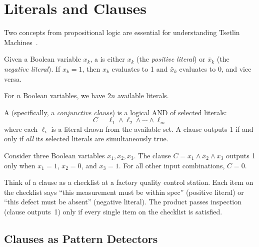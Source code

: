 \section{Literals and Clauses}
\label{sec:literals-clauses}

Two concepts from propositional logic are essential for understanding
Tsetlin Machines~\cite{granmo2018tsetlin}.

\begin{definition}[Literal]
\label{def:literal}
Given a Boolean variable $x_k$, a  is either $x_k$
(the \emph{positive literal}) or $\bar{x}_k$ (the \emph{negative
literal}). If $x_k = 1$, then $x_k$ evaluates to 1 and $\bar{x}_k$
evaluates to 0, and vice versa.
\end{definition}

For $n$ Boolean variables, we have $2n$ available literals.

\begin{definition}[Clause]
\label{def:clause}
A  (specifically, a \emph{conjunctive clause}) is a
logical AND of selected literals:
\begin{equation}
  C = \ell_1 \wedge \ell_2 \wedge \cdots \wedge \ell_m
  \label{eq:clause-def}
\end{equation}
where each $\ell_i$ is a literal drawn from the available set.
A clause outputs 1 if and only if \emph{all} its selected literals
are simultaneously true.
\end{definition}

\begin{example}
Consider three Boolean variables $x_1, x_2, x_3$. The clause
$C = x_1 \wedge \bar{x}_2 \wedge x_3$
outputs 1 only when $x_1 = 1$, $x_2 = 0$, and $x_3 = 1$.
For all other input combinations, $C = 0$.
\end{example}

\begin{analogy}
Think of a clause as a checklist at a factory quality control station.
Each item on the checklist says ``this measurement must be within
spec'' (positive literal) or ``this defect must be absent'' (negative
literal). The product passes inspection (clause outputs~1) only if
every single item on the checklist is satisfied.
\end{analogy}

\subsection{Clauses as Pattern Detectors}

